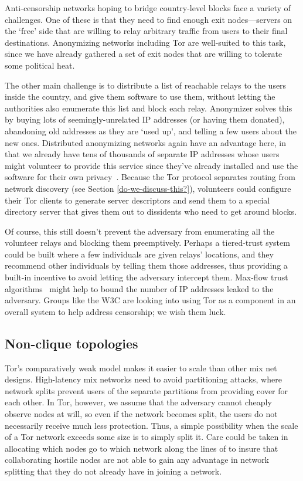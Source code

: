 \documentclass{llncs}
\begin{document}
Anti-censorship networks hoping to bridge country-level blocks face
a variety of challenges. One of these is that they need to find enough
exit nodes---servers on the `free' side that are willing to relay
arbitrary traffic from users to their final destinations. Anonymizing
networks including Tor are well-suited to this task, since we have
already gathered a set of exit nodes that are willing to tolerate some
political heat.

The other main challenge is to distribute a list of reachable relays
to the users inside the country, and give them software to use them,
without letting the authorities also enumerate this list and block each
relay. Anonymizer solves this by buying lots of seemingly-unrelated IP
addresses (or having them donated), abandoning old addresses as they are
`used up', and telling a few users about the new ones. Distributed
anonymizing networks again have an advantage here, in that we already
have tens of thousands of separate IP addresses whose users might
volunteer to provide this service since they've already installed and use
the software for their own privacy~\cite{koepsell:wpes2004}. Because
the Tor protocol separates routing from network discovery (see Section
\ref{do-we-discuss-this?}), volunteers could configure their Tor clients
to generate server descriptors and send them to a special directory
server that gives them out to dissidents who need to get around blocks.

Of course, this still doesn't prevent the adversary
from enumerating all the volunteer relays and blocking them preemptively.
Perhaps a tiered-trust system could be built where a few individuals are
given relays' locations, and they recommend other individuals by telling them
those addresses, thus providing a built-in incentive to avoid letting the
adversary intercept them. Max-flow trust algorithms~\cite{advogato}
might help to bound the number of IP addresses leaked to the adversary. Groups
like the W3C are looking into using Tor as a component in an overall system to
help address censorship; we wish them luck.


\subsection{Non-clique topologies}

Tor's comparatively  weak model makes it easier to scale than other mix net
designs.  High-latency mix networks need to avoid partitioning attacks, where
network splits prevent users of the separate partitions from providing cover
for each other.  In Tor, however, we assume that the adversary cannot
cheaply observe nodes at will, so even if the network becomes split, the
users do not necessarily receive much less protection.
Thus, a simple possibility when the scale of a Tor network
exceeds some size is to simply split it. Care could be taken in
allocating which nodes go to which network along the lines of
\cite{casc-rep} to insure that collaborating hostile nodes are not
able to gain any advantage in network splitting that they do not
already have in joining a network.
\end{document}
